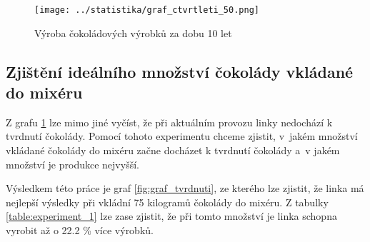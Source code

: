 \documentclass[11pt,a4paper,titlepage]{article}
\begin{document}
			\begin{figure}[H]
			\begin{center}
				\texttt{[image: ../statistika/graf\_ctvrtleti\_50.png]}
				\caption{ Výroba čokoládových výrobků za dobu 10 let }
				\label{fig:graf_ctvrtleti}
			\end{center}
			\end{figure}

		\subsection{Zjištění ideálního množství čokolády vkládané do mixéru}
			Z grafu \ref{fig:graf_ctvrtleti} lze mimo jiné vyčíst, že při aktuálním
			provozu linky nedochází k tvrdnutí čokolády. Pomocí tohoto experimentu
			chceme zjistit, v~jakém množství vkládané čokolády do mixéru začne
			docházet k tvrdnutí čokolády a~v jakém množství je produkce nejvyšší.

			Výsledkem této práce je graf \ref{fig:graf_tvrdnuti}, ze kterého lze zjistit,
			že linka má nejlepší výsledky při vkládní 75 kilogramů čokolády do mixéru.
			Z tabulky \ref{table:experiment_1} lze zase zjistit, že
			při tomto množství je linka schopna vyrobit až o 22.2 \% více výrobků.
\end{document}
